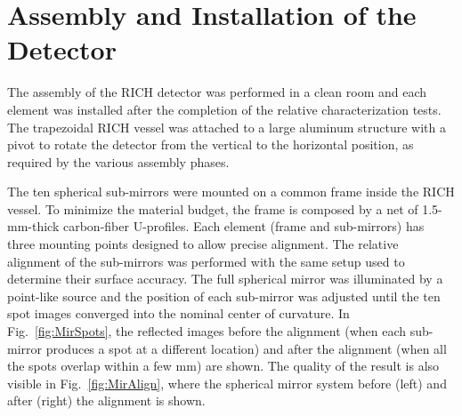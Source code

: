 \documentclass[5p,times,twocolumn]{elsarticle}
\begin{document}
\section{Assembly and Installation of the Detector}

The assembly of the RICH detector was performed in a clean room and each element was installed after the completion
of the relative characterization tests. The trapezoidal RICH vessel was attached to a large aluminum structure with a
pivot to rotate the detector from the vertical to the horizontal position, as required by the various assembly phases.

The ten spherical sub-mirrors were mounted on a common frame inside the RICH vessel. To
minimize the material budget, the frame is composed by a net of 1.5-mm-thick carbon-fiber U-profiles. Each element
(frame and sub-mirrors) has three mounting points designed to allow precise alignment. The relative alignment of
the sub-mirrors was performed with the same setup used to determine their surface accuracy. The full spherical
mirror was illuminated by a point-like source and the position of each sub-mirror was adjusted until the ten spot images
converged into the nominal center of curvature. In Fig.~\ref{fig:MirSpots}, the reflected images before the alignment
(when each sub-mirror produces a spot at a different location) and after the alignment (when all the spots overlap
within a few mm) are shown. The quality of the result is also visible in Fig.~\ref{fig:MirAlign}, where the spherical
mirror system before (left) and after (right) the alignment is shown.
\end{document}
